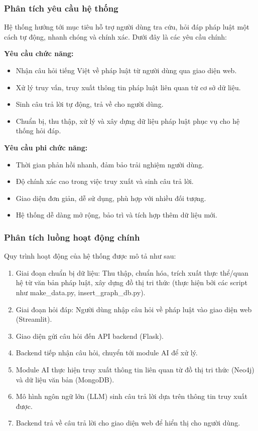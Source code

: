 \documentclass[a4paper]{article}
\begin{document}
\subsubsection{Phân tích yêu cầu hệ thống}
Hệ thống hướng tới mục tiêu hỗ trợ người dùng tra cứu, hỏi đáp pháp luật một cách tự động, nhanh chóng và chính xác. Dưới đây là các yêu cầu chính:

\textbf{Yêu cầu chức năng:}
\begin{itemize}
    \item Nhận câu hỏi tiếng Việt về pháp luật từ người dùng qua giao diện web.
    \item Xử lý truy vấn, truy xuất thông tin pháp luật liên quan từ cơ sở dữ liệu.
    \item Sinh câu trả lời tự động, trả về cho người dùng.
    \item Chuẩn bị, thu thập, xử lý và xây dựng dữ liệu pháp luật phục vụ cho hệ thống hỏi đáp.
\end{itemize}
\textbf{Yêu cầu phi chức năng:}
\begin{itemize}
    \item Thời gian phản hồi nhanh, đảm bảo trải nghiệm người dùng.
    \item Độ chính xác cao trong việc truy xuất và sinh câu trả lời.
    \item Giao diện đơn giản, dễ sử dụng, phù hợp với nhiều đối tượng.
    \item Hệ thống dễ dàng mở rộng, bảo trì và tích hợp thêm dữ liệu mới.
\end{itemize}

\subsubsection{Phân tích luồng hoạt động chính}
Quy trình hoạt động của hệ thống được mô tả như sau:
\begin{enumerate}
    \item Giai đoạn chuẩn bị dữ liệu: Thu thập, chuẩn hóa, trích xuất thực thể/quan hệ từ văn bản pháp luật, xây dựng đồ thị tri thức (thực hiện bởi các script như make\_data.py, insert\_graph\_db.py).
    \item Giai đoạn hỏi đáp: Người dùng nhập câu hỏi về pháp luật vào giao diện web (Streamlit).
    \item Giao diện gửi câu hỏi đến API backend (Flask).
    \item Backend tiếp nhận câu hỏi, chuyển tới module AI để xử lý.
    \item Module AI thực hiện truy xuất thông tin liên quan từ đồ thị tri thức (Neo4j) và dữ liệu văn bản (MongoDB).
    \item Mô hình ngôn ngữ lớn (LLM) sinh câu trả lời dựa trên thông tin truy xuất được.
    \item Backend trả về câu trả lời cho giao diện web để hiển thị cho người dùng.
\end{enumerate}
\end{document}
